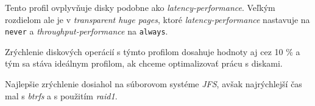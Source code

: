 Tento profil ovplyvňuje disky podobne ako \emph{latency-performance}. Veľkým
rozdielom ale je v \emph{transparent huge pages}, ktoré
\emph{latency-performance} nastavuje na \texttt{never} a
\emph{throughput-performance} na \texttt{always}.

Zrýchlenie diskových operácií s týmto profilom dosahuje hodnoty aj cez 10 \% a
tým sa stáva ideálnym profilom, ak chceme optimalizovať prácu s diskami.

Najlepšie zrýchlenie dosiahol na súborovom systéme \emph{JFS}, avšak
najrýchlejší čas mal s \emph{btrfs} a s použitím \emph{raid1}.
